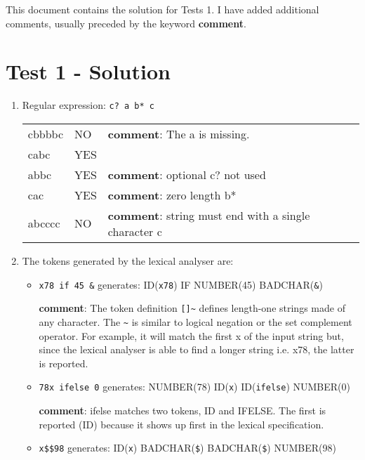 \documentclass{article}
\newcommand{\comment}{\textbf{comment}}
\begin{document}
\thispagestyle{empty}

\newcommand{\negra}[1]{\textbf{#1}}


This document contains the solution for Tests 1. I have added additional comments, usually preceded by the keyword \comment.


\section*{Test 1 - Solution}

\begin{enumerate}

\item Regular expression: \verb+c? a b* c+

\begin{tabular}{lll}
cbbbbc & NO & \comment: The a is missing.   \\
cabc & YES   \\
abbc & YES & \comment: optional c? not used \\
cac   & YES & \comment: zero length b* \\
abcccc & NO & \comment: string must end with a single character c    \\
\end{tabular}

\item The tokens generated by the lexical analyser are:

\begin{itemize}
\item \verb+x78 if 45 &+ generates: ID(\verb+x78+) IF NUMBER(45) BADCHAR(\verb+&+)
 
\comment: The token definition \verb+[]~+ defines length-one strings made of any character. The \verb+~+ is similar to logical negation or the set complement operator. For example, it will match the first x of the input string but, since the lexical analyser is able to find a longer string i.e. x78, the latter is reported.

\item \verb+78x ifelse 0+ generates: NUMBER(78) ID(\verb+x+) ID(\verb+ifelse+) NUMBER(0)

\comment: ifelse matches two tokens, ID and IFELSE. The first is reported (ID) because it shows up first in the lexical specification.

\item \verb+x$$98+ generates: ID(\verb+x+) BADCHAR(\verb+$+)  BADCHAR(\verb+$+)  NUMBER(98)
\end{itemize}



\end{enumerate}
\end{document}
